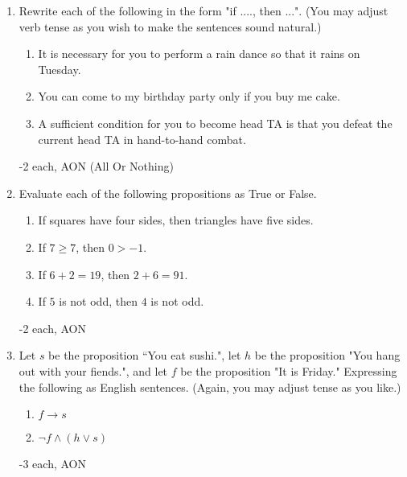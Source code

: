 \begin{enumerate}
    \item Rewrite each of the following in the form "if ...., then ...".  (You may adjust verb tense as you wish to make the sentences sound natural.) 
    \begin{enumerate}
        \item It is necessary for you to perform a rain dance so that it rains on Tuesday.
        \item You can come to my birthday party only if you buy me cake.
        \item A sufficient condition for you to become head TA is that you defeat the current head TA in hand-to-hand combat.
    \end{enumerate}
    \begin{rubric}
        -2 each, AON (All Or Nothing)
    \end{rubric}
    

    
    \item Evaluate each of the following propositions as True or False. 
    \begin{enumerate}
        \item If squares have four sides, then triangles have five sides.
        \item If $7 \geq 7$, then $0 > -1$.
        \item If $6+2 = 19$, then $2+6=91$.
        \item If $5$ is not odd, then $4$ is not odd. 
    \end{enumerate}
    \begin{rubric}
        -2 each, AON
    \end{rubric}


    
    \item Let $s$ be the proposition ``You eat sushi.", let $h$ be the proposition "You hang out with your fiends.", and let $f$ be the proposition "It is Friday." Expressing the following as English sentences. (Again, you may adjust tense as you like.) 
    \begin{enumerate}
        \item $f \rightarrow s$
        \item $\lnot f \wedge (h \vee s)$
    \end{enumerate}
    \begin{rubric}
        -3 each, AON
    \end{rubric}



\end{enumerate}
